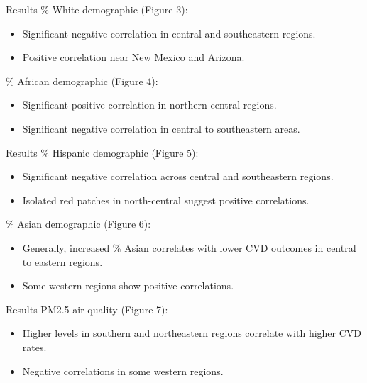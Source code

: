 \documentclass[
  ignorenonframetext,
]{beamer}
\begin{document}
\begin{frame}{Results}
\label{results-2}
\% White demographic (Figure 3):

\begin{itemize}
\item
  Significant negative correlation in central and southeastern regions.
\item
  Positive correlation near New Mexico and Arizona.
\end{itemize}

\% African demographic (Figure 4):

\begin{itemize}
\item
  Significant positive correlation in northern central regions.
\item
  Significant negative correlation in central to southeastern areas.
\end{itemize}
\end{frame}

\begin{frame}{Results}
\label{results-3}
\% Hispanic demographic (Figure 5):

\begin{itemize}
\item
  Significant negative correlation across central and southeastern
  regions.
\item
  Isolated red patches in north-central suggest positive correlations.
\end{itemize}

\% Asian demographic (Figure 6):

\begin{itemize}
\item
  Generally, increased \% Asian correlates with lower CVD outcomes in
  central to eastern regions.
\item
  Some western regions show positive correlations.
\end{itemize}
\end{frame}

\begin{frame}{Results}
\label{results-4}
PM2.5 air quality (Figure 7):

\begin{itemize}
\item
  Higher levels in southern and northeastern regions correlate with
  higher CVD rates.
\item
  Negative correlations in some western regions.
\end{itemize}
\end{frame}
\end{document}
